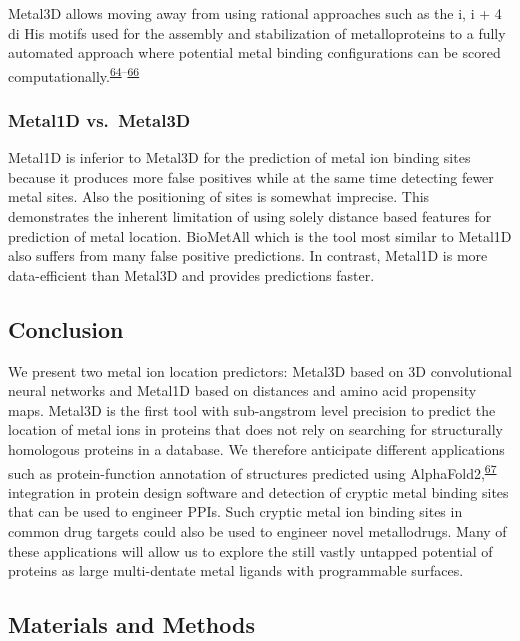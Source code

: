 \documentclass[  ASAPversion,
  ,
  9pt]{elife}
\begin{document}
Metal3D allows moving away from using rational approaches such as the i, i + 4 di His motifs used for the assembly and stabilization of metalloproteins to a fully automated approach where potential metal binding configurations can be scored computationally.\textsuperscript{\protect\hyperlink{ref-RJ44nj3R}{64}--\protect\hyperlink{ref-85PeY3aG}{66}}

\hypertarget{metal1d-vs.-metal3d}{%
\subsubsection{Metal1D vs.~Metal3D}\label{metal1d-vs.-metal3d}}

Metal1D is inferior to Metal3D for the prediction of metal ion binding sites because it produces more false positives while at the same time detecting fewer metal sites. Also the positioning of sites is somewhat imprecise. This demonstrates the inherent limitation of using solely distance based features for prediction of metal location. BioMetAll which is the tool most similar to Metal1D also suffers from many false positive predictions. In contrast, Metal1D is more data-efficient than Metal3D and provides predictions faster.

\hypertarget{conclusion}{%
\subsection{Conclusion}\label{conclusion}}

We present two metal ion location predictors: Metal3D based on 3D convolutional neural networks and Metal1D based on distances and amino acid propensity maps. Metal3D is the first tool with sub-angstrom level precision to predict the location of metal ions in proteins that does not rely on searching for structurally homologous proteins in a database. We therefore anticipate different applications such as protein-function annotation of structures predicted using AlphaFold2,\textsuperscript{\protect\hyperlink{ref-10bYywzs6}{67}} integration in protein design software and detection of cryptic metal binding sites that can be used to engineer PPIs. Such cryptic metal ion binding sites in common drug targets could also be used to engineer novel metallodrugs. Many of these applications will allow us to explore the still vastly untapped potential of proteins as large multi-dentate metal ligands with programmable surfaces.

\hypertarget{materials-and-methods}{%
\subsection{Materials and Methods}\label{materials-and-methods}}
\end{document}
